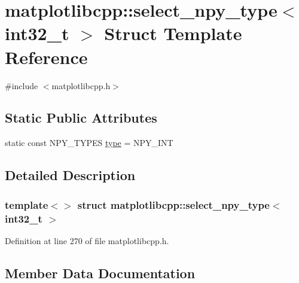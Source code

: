 \hypertarget{structmatplotlibcpp_1_1select__npy__type_3_01int32__t_01_4}{}\section{matplotlibcpp\+::select\+\_\+npy\+\_\+type$<$ int32\+\_\+t $>$ Struct Template Reference}
\label{structmatplotlibcpp_1_1select__npy__type_3_01int32__t_01_4}


{\ttfamily \#include $<$matplotlibcpp.\+h$>$}

\subsection*{Static Public Attributes}
\begin{DoxyCompactItemize}
\item 
static const N\+P\+Y\+\_\+\+T\+Y\+P\+ES \mbox{\hyperlink{structmatplotlibcpp_1_1select__npy__type_3_01int32__t_01_4_abcfd0c3dc5d5e92575c04747315cb4d5}{type}} = N\+P\+Y\+\_\+\+I\+NT
\end{DoxyCompactItemize}


\subsection{Detailed Description}
\subsubsection*{template$<$$>$\newline
struct matplotlibcpp\+::select\+\_\+npy\+\_\+type$<$ int32\+\_\+t $>$}



Definition at line 270 of file matplotlibcpp.\+h.



\subsection{Member Data Documentation}
\mbox{\label{structmatplotlibcpp_1_1select__npy__type_3_01int32__t_01_4_abcfd0c3dc5d5e92575c04747315cb4d5}} 
